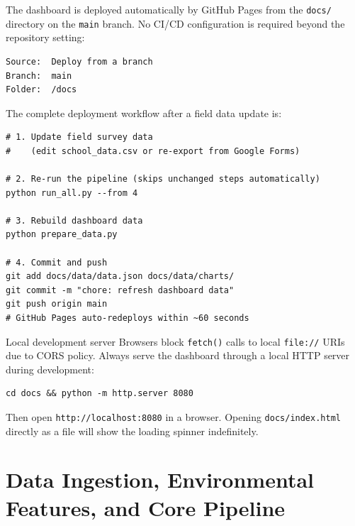 \documentclass[11pt,a4paper,openany]{book}
\begin{document}
The dashboard is deployed automatically by GitHub Pages from the \texttt{docs/}
directory on the \texttt{main} branch.  No CI/CD configuration is required beyond
the repository setting:

\begin{lstlisting}[style=text, caption={GitHub Pages setting (repository Settings > Pages).}]
Source:  Deploy from a branch
Branch:  main
Folder:  /docs
\end{lstlisting}

The complete deployment workflow after a field data update is:

\begin{lstlisting}[style=bash, caption={End-to-end update workflow.}]
# 1. Update field survey data
#    (edit school_data.csv or re-export from Google Forms)

# 2. Re-run the pipeline (skips unchanged steps automatically)
python run_all.py --from 4

# 3. Rebuild dashboard data
python prepare_data.py

# 4. Commit and push
git add docs/data/data.json docs/data/charts/
git commit -m "chore: refresh dashboard data"
git push origin main
# GitHub Pages auto-redeploys within ~60 seconds
\end{lstlisting}

\begin{tipbox}{Local development server}
Browsers block \texttt{fetch()} calls to local \texttt{file://} URIs due to CORS policy.
Always serve the dashboard through a local HTTP server during development:

\begin{lstlisting}[style=bash]
cd docs && python -m http.server 8080
\end{lstlisting}

Then open \texttt{http://localhost:8080} in a browser.
Opening \texttt{docs/index.html} directly as a file will show the loading spinner
indefinitely.
\end{tipbox}

\part{Data Ingestion, Environmental Features, and Core Pipeline}
\end{document}

